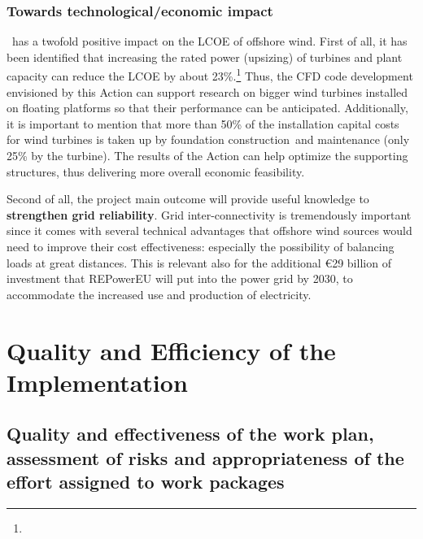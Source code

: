 \vspace{-2ex}\subsubsection*{Towards technological/economic impact}\vspace{-1ex}
\nameAction\ has a twofold positive impact on the LCOE of offshore wind. First of all, it has been identified that increasing the rated power (upsizing) of turbines and plant capacity can reduce the LCOE by about 23\%.\footnote{} Thus, the CFD code development envisioned by this Action can support research on bigger wind turbines installed on floating platforms so that their performance can be anticipated. Additionally, it is important to mention that more than 50\% of the installation capital costs for wind turbines is taken up by foundation construction and maintenance (only 25\% by the turbine). The results of the Action can help optimize the supporting structures, thus delivering more overall economic feasibility.

Second of all, the project main outcome will provide useful knowledge to \textbf{strengthen grid reliability}. Grid inter-connectivity is tremendously important since it comes with several technical advantages that offshore wind sources would need to improve their cost effectiveness: especially the possibility of balancing loads at great distances. This is relevant also for the additional €29 billion of investment that REPowerEU will put into the power grid by 2030, to accommodate the increased use and production of electricity.
 {}\vspace{-2ex}
\section{ Quality and Efficiency of the Implementation }
\vspace{-6pt}
\subsection{Quality and effectiveness of the work plan, assessment of risks and appropriateness of the effort assigned to work packages}

